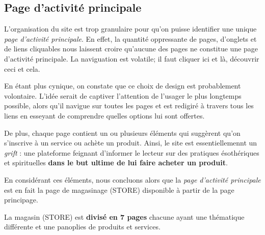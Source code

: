 \documentclass[9pt]{report}
\begin{document}
\begin{multicols*}{2}
  \section{Page d'activité principale}
  L'organisation du site est trop granulaire pour qu'on puisse identifier 
  une unique \textit{page d'activité principale}. En effet, la quantité 
  oppressante de pages, d'onglets et de liens cliquables nous laissent 
  croire qu'aucune des pages ne constitue une page d'activité principale. 
  La naviguation est volatile; il faut cliquer ici et là, découvrir ceci et 
  cela. 

  En étant plus cynique, on constate que ce choix de design est probablement 
  volontaire. L'idée serait de captiver l'attention  de l'usager le plus 
  longtemps possible, alors qu'il navigue sur toutes les pages 
  et est redigiré à travers tous les liens en esseyant de comprendre 
  quelles options lui sont offertes. 
  
  De plus, chaque page contient un ou plusieurs éléments qui suggèrent 
  qu'on s'inscrive à un service ou achète un produit. Ainsi, le site 
  est essentiellemennt un \textit{grift} : une plateforme feignant 
  d'informer le lecteur sur des pratiques ésothériques et spirituelles 
  \textbf{dans le but ultime de lui faire acheter un produit}.
  
  En considérant ces éléments, nous concluons alors que la 
  \textit{page d'activité principale} est en fait la page de magasinage 
  (STORE) disponible à partir de la page principage.

  \begin{note}{}{}
    La magasin (STORE) est \textbf{divisé en 7 pages} chacune ayant une thématique 
    différente et une panoplies de produits et services. 
  \end{note}


    \begin{figure}[H]
    \scriptsize{
     }
    \end{figure}


\end{multicols*}
\end{document}

